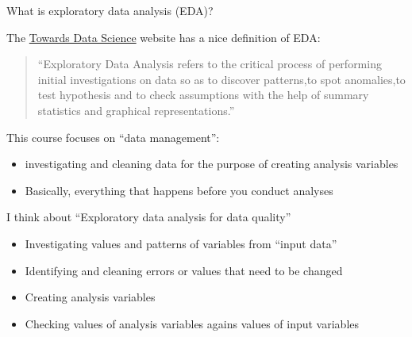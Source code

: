 \documentclass[8pt,ignorenonframetext,dvipsnames]{beamer}
\providecommand{\tightlist}{%
  \setlength{\itemsep}{0pt}\setlength{\parskip}{0pt}}
\let\olditem\item
\renewcommand{\item}{%
  \olditem\vspace{4pt}
}
\begin{document}
\begin{frame}{What is exploratory data analysis (EDA)?}

The
\href{https://towardsdatascience.com/exploratory-data-analysis-8fc1cb20fd15}{Towards
Data Science} website has a nice definition of EDA:

\begin{quote}
``Exploratory Data Analysis refers to the critical process of performing
initial investigations on data so as to discover patterns,to spot
anomalies,to test hypothesis and to check assumptions with the help of
summary statistics and graphical representations.''
\end{quote}

This course focuses on ``data management'':

\begin{itemize}
\tightlist
\item
  investigating and cleaning data for the purpose of creating analysis
  variables
\item
  Basically, everything that happens before you conduct analyses
\end{itemize}

I think about ``Exploratory data analysis for data quality''

\begin{itemize}
\tightlist
\item
  Investigating values and patterns of variables from ``input data''
\item
  Identifying and cleaning errors or values that need to be changed
\item
  Creating analysis variables
\item
  Checking values of analysis variables agains values of input variables
\end{itemize}

\end{frame}
\end{document}
